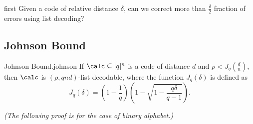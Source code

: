 	\begin{question}{}{first}
		Given a code of relative distance $\delta$, can we correct more than $\frac{\delta}{2}$ fraction of errors using list decoding?		
	\end{question}
	
	
	
	
	\subsection{Johnson Bound}
	\begin{theorem}{Johnson Bound.}{johnson}
		If $\calc\subseteq[q]^n$ is a code of distance $d$ and $\rho<J_q(\frac{d}{n})$, then $\calc$ is $(\rho, qnd)$-list decodable, where the function $J_q(\delta)$ is defined as 
		\[
		J_q(\delta) = \left( 1 - \frac{1}{q}\right)\left(1 - \sqrt{1-\frac{q\delta}{q-1}}\right).
		\]
	\end{theorem}
	\emph{(The following proof is for the case of binary alphabet.)}
	
